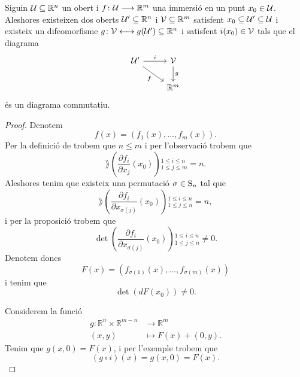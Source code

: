 \documentclass[../../Main.tex]{subfiles}
\begin{document}
	\begin{theorem}
		\label{thm:Teorema d'estructura local de les immersions}
		Siguin \(\mathcal{U}\subseteq\mathbb{R}^{n}\) un obert i \(f\colon\mathcal{U}\longrightarrow\mathbb{R}^{m}\) una immersió en un punt \(x_{0}\in\mathcal{U}\). Aleshores existeixen dos oberts \(\mathcal{U}'\subseteq\mathbb{R}^{n}\) i \(\mathcal{V}\subseteq\mathbb{R}^{m}\) satisfent \(x_{0}\subseteq\mathcal{U}'\subseteq\mathcal{U}\) i existeix un difeomorfisme \(g\colon\mathcal{V}\longleftrightarrow g(\mathcal{U}')\subseteq\mathbb{R}^{n}\) i satisfent \(i(x_{0})\in\mathcal{V}\) tals que el diagrama
		\[\begin{tikzcd}
			\obert{U}' \arrow{r}{i} \arrow[swap]{dr}{f} & \obert{V} \arrow{d}{g} \\
			& \mathbb{R}^{m}
		\end{tikzcd}\]
		és un diagrama commutatiu.
		\begin{proof}
			Denotem
			\[
			    f(x)=(f_{1}(x),\dots,f_{m}(x)).
			\]
			Per la definició de  trobem que \(n\leq m\) i per l'observació  trobem que
			\[
			    \rang\left(\frac{\partial f_{i}}{\partial x_{j}}(x_{0})\right){}_{1\leq j\leq m}^{1\leq i\leq n}=n.
			\]
			Aleshores tenim que existeix una permutació \(\sigma\in\operatorname{S}_{n}\) tal que
			\[
			    \rang\left(\frac{\partial f_{i}}{\partial x_{\sigma(j)}}(x_{0})\right){}_{1\leq j\leq n}^{1\leq i\leq n}=n,
			\]
			i per la proposició  trobem que
			\[
			    \det\left(\frac{\partial f_{i}}{\partial x_{\sigma(j)}}(x_{0})\right){}_{1\leq j\leq n}^{1\leq i\leq n}\neq0.
			\]
			Denotem doncs
			\[
			    F(x)=(f_{\sigma(1)}(x),\dots,f_{\sigma(m)}(x))
			\]
			i tenim que
			\begin{equation}
				\label{thm:Teorema d'estructura local de les immersions:eq:1}
				\det(dF(x_{0}))\neq0.
			\end{equation}
			
			Considerem la funció
			\begin{align*}
				g\colon\mathbb{R}^{n}\times\mathbb{R}^{m-n}&\longrightarrow\mathbb{R}^{m} \\
				(x,y)&\longmapsto F(x)+(0,y).
			\end{align*}
			Tenim que \(g(x,0)=F(x)\), i per l'exemple  trobem que
			\[
			    (g\circ i)(x)=g(x,0)=F(x).
			\]
			

\end{proof}
\end{theorem}
\end{document}
